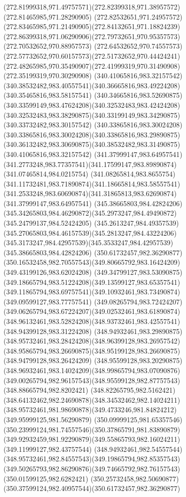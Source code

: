 {{	\curveto(272.81999318,971.49757571)(272.82399318,971.38957572)(272.81465985,971.28290905)
	\curveto(272.82532651,971.24957572)(272.83465985,971.21490905)(272.84132651,971.18824239)
	\curveto(272.86399318,971.06290906)(272.79732651,970.95357573)(272.70532652,970.88957573)
	\curveto(272.64532652,970.74557573)(272.57732652,970.60157573)(272.51732652,970.44424241)
	\curveto(272.48265985,970.35490907)(272.41999319,970.31490908)(272.35199319,970.30290908)
	\moveto(340.41065816,983.32157542)
	\curveto(340.38532482,983.40557541)(340.36665816,983.49224208)(340.35465816,983.58157541)
	\curveto(340.34665816,983.52690875)(340.33599149,983.47624208)(340.32532483,983.42424208)
	\curveto(340.32532483,983.38290875)(340.33199149,983.34290875)(340.33732482,983.30157542)
	\curveto(340.33865816,983.30024208)(340.33865816,983.30024208)(340.33865816,983.29890875)
	\curveto(340.36132482,983.30690875)(340.38532482,983.31490875)(340.41065816,983.32157542)
	\moveto(341.37999147,983.64957541)
	\curveto(341.2773248,983.77357541)(341.17599147,983.89890874)(341.07465814,984.0215754)
	\curveto(341.08265814,983.8655754)(341.11732481,983.71890874)(341.18665814,983.58557541)
	\curveto(341.2533248,983.60690874)(341.31865813,983.62690874)(341.37999147,983.64957541)
	\moveto(345.38665803,984.42824206)
	\curveto(345.34265803,984.46290872)(345.2973247,984.49490872)(345.24799137,984.52424205)
	\curveto(345.2613247,984.49357539)(345.27065803,984.46157539)(345.2813247,984.43224206)
	\curveto(345.3173247,984.42957539)(345.3533247,984.42957539)(345.38665803,984.42824206)
	\moveto(350.61732457,982.36290877)
	\curveto(350.16532458,982.70557543)(349.80665792,983.16424209)(349.43199126,983.62024208)
	\curveto(349.34799127,983.53090875)(349.18665794,983.51224208)(349.13599127,983.65357541)
	\curveto(349.11865794,983.69757541)(349.10932461,983.73490874)(349.09599127,983.77757541)
	\curveto(349.08265794,983.72424207)(349.06265794,983.67224207)(349.02532461,983.61890874)
	\curveto(348.96132461,983.52824208)(348.93732461,983.42557541)(348.94399128,983.31224208)
	\curveto(348.94932461,983.29890875)(348.95732461,983.28424208)(348.96399128,983.26957542)
	\curveto(348.95865794,983.26690875)(348.95199128,983.26690875)(348.94799128,983.26424209)
	\curveto(348.95599128,983.20290875)(348.96932461,983.14024209)(348.99865794,983.07090876)
	\curveto(349.00265794,982.96157543)(348.95599128,982.87757543)(348.88665794,982.8202421)
	\curveto(348.82265795,982.5162421)(348.64132462,982.24690878)(348.34532462,982.14024211)
	\curveto(348.95732461,981.98690878)(349.4733246,981.84824212)(349.95999125,981.56290879)
	\curveto(350.09999125,981.65357546)(350.23999124,981.74557546)(350.37865791,981.83890879)
	\curveto(349.92932459,981.92290879)(349.55865793,982.16024211)(349.11999127,982.43757544)
	\curveto(348.94932461,982.54557544)(348.95732461,982.84557543)(349.19865794,982.85357543)
	\curveto(349.50265793,982.86290876)(349.74665792,982.76157543)(350.01599125,982.6282421)
	\curveto(350.25732458,982.50690877)(350.37599124,982.40957544)(350.61732457,982.36290877)
}
}

